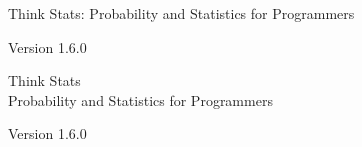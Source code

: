 \documentclass[12pt]{book}
\newcommand{\theversion}{1.6.0}
\begin{document}



\begin{latexonly}

\renewcommand{\blankpage}{\thispagestyle{empty} \quad \newpage}



\thispagestyle{empty}

\begin{flushright}
\vspace*{2.0in}

\begin{spacing}{3}
{\huge Think Stats: Probability and Statistics for Programmers}\\
{\Large }
\end{spacing}

\vspace{0.25in}

Version \theversion

\vfill

\end{flushright}


\blankpage
\blankpage

\pagebreak
\thispagestyle{empty}

\begin{flushright}
\vspace*{2.0in}

\begin{spacing}{3}
{\huge Think Stats}\\
{\Large Probability and Statistics for Programmers}
\end{spacing}

\vspace{0.25in}

Version \theversion

\vspace{1in}



\end{flushright}
\end{latexonly}
\end{document}
